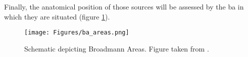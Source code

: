 Finally, the anatomical position of those sources will be assessed by the \acrfull{ba} in which they are situated \cite{brodmannBrodmannsLocalisationCerebral2005} (figure \ref{fig:ba_scheme}).

\begin{figure}[H]
	\centering
	\texttt{[image: Figures/ba\_areas.png]}
	\caption{Schematic depicting Broadmann Areas. Figure taken from \cite{strotzerOneCenturyBrain2009}. \label{fig:ba_scheme}}
\end{figure}
